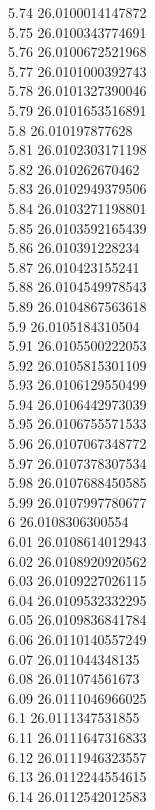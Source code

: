 {5.74	26.0100014147872\\
5.75	26.0100343774691\\
5.76	26.0100672521968\\
5.77	26.0101000392743\\
5.78	26.0101327390046\\
5.79	26.0101653516891\\
5.8	26.010197877628\\
5.81	26.0102303171198\\
5.82	26.010262670462\\
5.83	26.0102949379506\\
5.84	26.0103271198801\\
5.85	26.0103592165439\\
5.86	26.010391228234\\
5.87	26.010423155241\\
5.88	26.0104549978543\\
5.89	26.0104867563618\\
5.9	26.0105184310504\\
5.91	26.0105500222053\\
5.92	26.0105815301109\\
5.93	26.0106129550499\\
5.94	26.0106442973039\\
5.95	26.0106755571533\\
5.96	26.0107067348772\\
5.97	26.0107378307534\\
5.98	26.0107688450585\\
5.99	26.0107997780677\\
6	26.0108306300554\\
6.01	26.0108614012943\\
6.02	26.0108920920562\\
6.03	26.0109227026115\\
6.04	26.0109532332295\\
6.05	26.0109836841784\\
6.06	26.0110140557249\\
6.07	26.011044348135\\
6.08	26.011074561673\\
6.09	26.0111046966025\\
6.1	26.0111347531855\\
6.11	26.0111647316833\\
6.12	26.0111946323557\\
6.13	26.0112244554615\\
6.14	26.0112542012583\\
}
